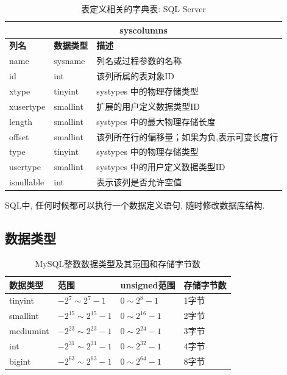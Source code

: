\begin{table}[H]
\centering
\label{tab:syscolumns}
\begin{tabular}{|l|l|l|}
\hline
\multicolumn{3}{|c|}{syscolumns} \\ \hline
\textbf{列名} & \textbf{数据类型} & \textbf{描述} \\ \hline
name & sysname & 列名或过程参数的名称 \\ \hline
id & int & 该列所属的表对象ID \\ \hline
 xtype & tinyint & systypes 中的物理存储类型 \\ \hline
xusertype & smallint & 扩展的用户定义数据类型ID \\ \hline
length & smallint & systypes 中的最大物理存储长度 \\ \hline
offset & smallint & 该列所在行的偏移量；如果为负,表示可变长度行 \\ \hline
type & tinyint & systypes 中的物理存储类型 \\ \hline
usertype & smallint & systypes 中的用户定义数据类型ID \\ \hline
isnullable & int & 表示该列是否允许空值 \\ \hline
\end{tabular}
\caption{表定义相关的字典表: SQL Server}
\end{table}

SQL中, 任何时候都可以执行一个数据定义语句, 随时修改数据库结构.

\subsection{数据类型}

\begin{table}[H]
\centering
\label{tab:mysql_int_types}
\begin{tabular}{|l|l|l|l|}
\hline
\textbf{数据类型} & \textbf{范围} & \textbf{unsigned范围} & \textbf{存储字节数} \\ \hline
tinyint & $-2^7 \sim 2^7 - 1$ & $0 \sim 2^8 - 1$ & 1字节 \\ \hline
smallint & $-2^{15} \sim 2^{15} - 1$ & $0 \sim 2^{16} - 1$ & 2字节 \\ \hline
mediumint & $-2^{23} \sim 2^{23} - 1$ & $0 \sim 2^{24} - 1$ & 3字节 \\ \hline
int & $-2^{31} \sim 2^{31} - 1$ & $0 \sim 2^{32} - 1$ & 4字节 \\ \hline
bigint & $-2^{63} \sim 2^{63} - 1$ & $0 \sim 2^{64} - 1$ & 8字节 \\ \hline
\end{tabular}
\caption{MySQL整数数据类型及其范围和存储字节数}
\end{table}

